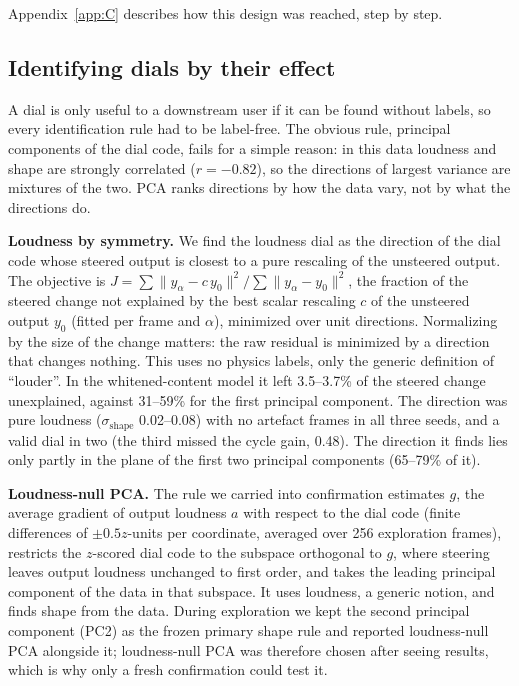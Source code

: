\documentclass[10pt]{article}
\begin{document}
Appendix~\ref{app:C} describes how this design was reached, step by step.

\subsection{Identifying dials by their effect}\label{sec:6.3}

A dial is only useful to a downstream user if it can be found without labels, so every identification rule had to be label-free. The obvious rule, principal components of the dial code, fails for a simple reason: in this data loudness and shape are strongly correlated ($r = -0.82$), so the directions of largest variance are mixtures of the two. PCA ranks directions by how the data vary, not by what the directions do.

\textbf{Loudness by symmetry.} We find the loudness dial as the direction of the dial code whose steered output is closest to a pure rescaling of the unsteered output. The objective is $J = \sum\|y_\alpha - c\, y_0\|^2 / \sum\|y_\alpha - y_0\|^2$, the fraction of the steered change not explained by the best scalar rescaling $c$ of the unsteered output $y_0$ (fitted per frame and $\alpha$), minimized over unit directions. Normalizing by the size of the change matters: the raw residual is minimized by a direction that changes nothing. This uses no physics labels, only the generic definition of ``louder''. In the whitened-content model it left 3.5--3.7\% of the steered change unexplained, against 31--59\% for the first principal component. The direction was pure loudness ($\sigma_{\mathrm{shape}}$ 0.02--0.08) with no artefact frames in all three seeds, and a valid dial in two (the third missed the cycle gain, 0.48). The direction it finds lies only partly in the plane of the first two principal components (65--79\% of it).

\textbf{Loudness-null PCA.} The rule we carried into confirmation estimates $g$, the average gradient of output loudness $a$ with respect to the dial code (finite differences of $\pm 0.5 z$-units per coordinate, averaged over 256 exploration frames), restricts the $z$-scored dial code to the subspace orthogonal to $g$, where steering leaves output loudness unchanged to first order, and takes the leading principal component of the data in that subspace. It uses loudness, a generic notion, and finds shape from the data. During exploration we kept the second principal component (PC2) as the frozen primary shape rule and reported loudness-null PCA alongside it; loudness-null PCA was therefore chosen after seeing results, which is why only a fresh confirmation could test it.
\end{document}
